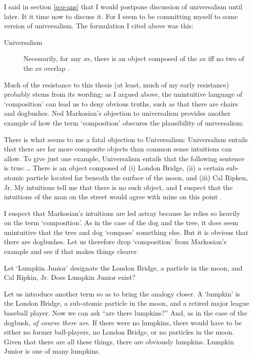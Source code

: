 \documentclass[11pt]{article}
\newenvironment{squote}{%
\begin{spacing}{1}
       	\begin{list}{}{%
\setlength{\labelwidth}{0pt}%
\rightmargin\leftmargin%
}
\item\relax
}{%
\end{list}%
\end{spacing}
}
\begin{document}
\begin{spacing}{1.25}
I said in section \ref{scq-ans} that I would postpone discussion of
universalism until later.  It it time now to discuss it.  For I seem
to be committing myself to some version of universalism.  The
formulation I cited above was this:

\begin{description}
\item[Universalism] Necessarily, for any $x$s, there is an object
  composed of the $x$s iff no two of the $x$s overlap
  \citep[227]{markosian1998a}.
\end{description}

Much of the resistance to this thesis (at least, much of my early
resistance) probably stems from its wording; as I argued above, the
unintuitive language of `composition' can lead us to deny obvious
truths, such as that there are chairs and dogbushes.  Ned Markosian's
objection to universalism provides another example of how the term
`composition' obscures the plausibility of universalism:

\begin{squote}
There is what seems to me a fatal objection to Universalism:
Universalism entails that there are far more composite objects than
common sense intuitions can allow.  To give just one example,
Universalism entails that the following sentence is true:\,\ldots
There is an object composed of (i) London Bridge, (ii) a certain
sub-atomic particle located far beneath the surface of the moon, and
(iii) Cal Ripken, Jr.  My intuitions tell me that there is no such
object, and I suspect that the intuitions of the man on the street
would agree with mine on this point \citeyearpar[228]{markosian1998a}.
\end{squote}

I suspect that Markosian's intuitions are led astray because he relies
so heavily on the term `composition'.  As in the case of the dog and
the tree, it does seem unintuitive that the tree and dog `compose'
something else.  But it is obvious that there are dogbushes.  Let us
therefore drop `composition' from Markosian's example and see if that
makes things clearer.

Let `Lumpkin Junior' designate the London Bridge, a particle in the
moon, and Cal Ripkin, Jr.  Does Lumpkin Junior exist?

Let us introduce another term so as to bring the analogy closer.  A
`lumpkin' is the London Bridge, a sub-atomic particle in the moon, and
a retired major league baseball player.  Now we can ask ``are there
lumpkins?''  And, as in the case of the dogbush, {\em of course there
  are}.  If there were no lumpkins, there would have to be either no
former ball-players, no London Bridge, or no particles in the moon.
Given that there are all these things, there are obviously lumpkins.
Lumpkin Junior is one of many lumpkins.


\end{spacing}
\end{document}
